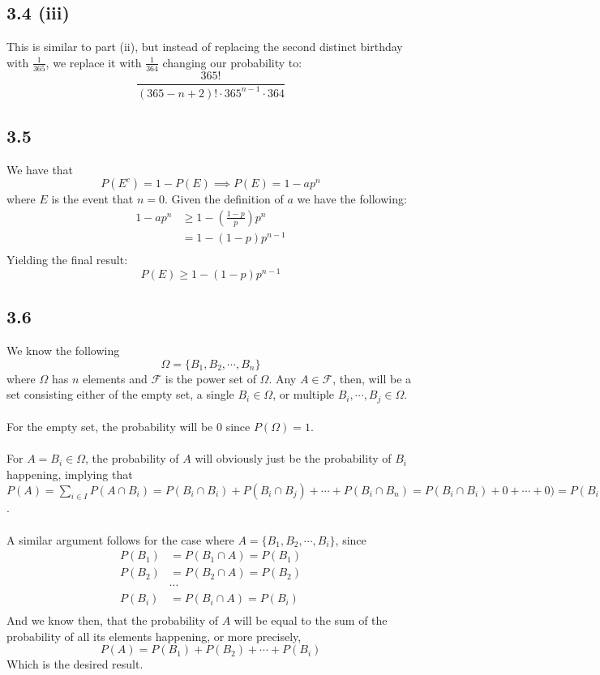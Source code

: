 \documentclass[letterpaper,12pt]{article}
\theoremstyle{definition}
\begin{document}
\subsection*{3.4 (iii)}
This is similar to part (ii), but instead of replacing the second distinct birthday with $\frac{1}{365}$, we replace it with $\frac{1}{364}$ changing our probability to:
\[ \frac{365!}{(365-n+2)! \cdot 365^{n-1}\cdot 364}\]
\subsection*{3.5}
We have that \[P(E^c) = 1 - P(E) \implies P(E) = 1 - ap^n\] where $E$ is the event that $n=0$. Given the definition of $a$ we have the following:
\begin{align*}
    1 - ap^n &\geq 1 - \left( \frac{1-p}{p} \right)p^n \\
    &= 1 - (1-p)p^{n-1} \\
\end{align*}
Yielding the final result:
\[  P(E) \geq 1 - (1-p)p^{n-1} \]

\subsection*{3.6}
We know the following
\[\Omega = \{B_1, B_2,\cdots, B_n\}\]
where $\Omega$ has $n$ elements and $\mathscr{F}$ is the power set of $\Omega$. Any $A \in \mathscr{F}$, then, will be a set consisting either of the empty set, a single $B_i \in \Omega$, or multiple $B_i,\cdots, B_j \in \Omega$. 
\\\\
For the empty set, the probability will be $0$ since $P(\Omega) = 1$.\\\\ 
For $A = B_i \in \Omega$, the probability of $A$ will obviously just be the probability of $B_i$ happening, implying that $P(A) = \sum_{i \in I} P(A\cap B_i) = P(B_i \cap B_i) + P(B_i \cap B_j) +\cdots + P(B_i \cap B_n) = P(B_i \cap B_i) + 0 +\cdots + 0) =  P(B_i \cap B_i) = P(B_i) = P(A)$.\\\\
A similar argument follows for the case where $A = \{B_1, B_2,\cdots,B_i\}$, since 
\begin{align*}
    P(B_1) &= P(B_1 \cap A) = P(B_1) \\
    P(B_2) &= P(B_2 \cap A) = P(B_2) \\
    &\cdots\\
    P(B_i) &= P(B_i \cap A) = P(B_i) \\
\end{align*}
And we know then, that the probability of $A$ will be equal to the sum of the probability of all its elements happening, or more precisely,
\[P(A) = P(B_1) + P(B_2) +\cdots+ P(B_i)\]
Which is the desired result.
\end{document}
